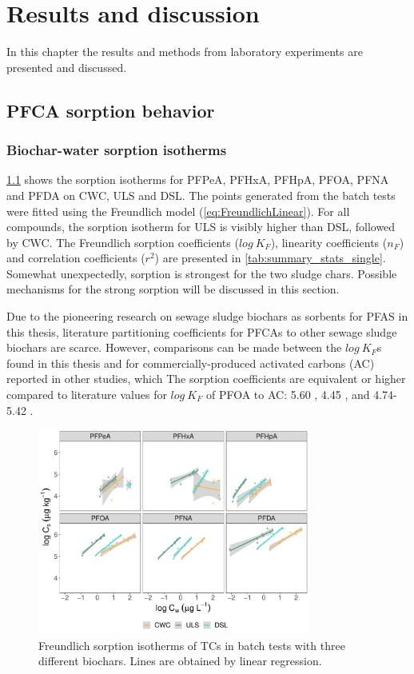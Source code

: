 \chapter{Results and discussion}\label{chap:Results&Disc}
In this chapter the results and methods from laboratory experiments are presented and discussed.

\section{PFCA sorption behavior}
\subsection{Biochar-water sorption isotherms}
\cref{fig:sorption_isotherms} shows the sorption isotherms for PFPeA, PFHxA, PFHpA, PFOA, PFNA and PFDA on CWC, ULS and DSL. The points generated from the batch tests were fitted using the Freundlich model (\cref{eq:FreundlichLinear}). For all compounds, the sorption isotherm for ULS is visibly higher than DSL, followed by CWC. The Freundlich sorption coefficients ($log~K_F$), linearity coefficients ($n_F$) and correlation coefficients ($r^2$) are presented in \cref{tab:summary_stats_single}. Somewhat unexpectedly, sorption is strongest for the two sludge chars. Possible mechanisms for the strong sorption will be discussed in this section. 

Due to the pioneering research on sewage sludge biochars as sorbents for PFAS in this thesis, literature partitioning coefficients for PFCAs to other sewage sludge biochars are scarce. However, comparisons can be made between the $log~K_F$s found in this thesis and for commercially-produced activated carbons (AC) reported in other studies, which  The sorption coefficients are equivalent or higher compared to literature values for $log~K_F$ of PFOA to AC: 5.60 \citep{Kupryianchyk2016a}, 4.45 \citep{hansen2010sorption}, and 4.74-5.42 \citep{silvani2019can}.

\begin{figure}[tb]
    \centering
    \includegraphics[width=0.8\textwidth]{R/figs/Sorption_isotherms_single_BC.pdf}
    \caption{Freundlich sorption isotherms of TCs in batch tests with three different biochars. Lines are obtained by linear regression.}
    \label{fig:sorption_isotherms}
\end{figure}


